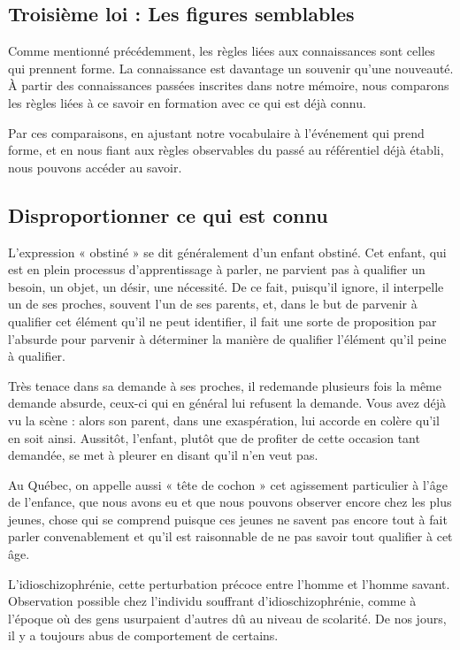 \documentclass[12pt,oneside]{article}
\begin{document}
\subsection{Troisième loi : Les figures semblables}

Comme mentionné précédemment, les règles liées aux connaissances sont celles qui prennent forme. La connaissance est davantage un souvenir qu'une nouveauté. À partir des connaissances passées inscrites dans notre mémoire, nous comparons les règles liées à ce savoir en formation avec ce qui est déjà connu.

Par ces comparaisons, en ajustant notre vocabulaire à l'événement qui prend forme, et en nous fiant aux règles observables du passé au référentiel déjà établi, nous pouvons accéder au savoir.

\subsection{Disproportionner ce qui est connu}

L'expression « obstiné » se dit généralement d'un enfant obstiné. Cet enfant, qui est en plein processus d'apprentissage à parler, ne parvient pas à qualifier un besoin, un objet, un désir, une nécessité. De ce fait, puisqu'il ignore, il interpelle un de ses proches, souvent l'un de ses parents, et, dans le but de parvenir à qualifier cet élément qu'il ne peut identifier, il fait une sorte de proposition par l'absurde pour parvenir à déterminer la manière de qualifier l'élément qu'il peine à qualifier.

Très tenace dans sa demande à ses proches, il redemande plusieurs fois la même demande absurde, ceux-ci qui en général lui refusent la demande. Vous avez déjà vu la scène : alors son parent, dans une exaspération, lui accorde en colère qu'il en soit ainsi. Aussitôt, l'enfant, plutôt que de profiter de cette occasion tant demandée, se met à pleurer en disant qu'il n'en veut pas.

Au Québec, on appelle aussi « tête de cochon » cet agissement particulier à l'âge de l'enfance, que nous avons eu et que nous pouvons observer encore chez les plus jeunes, chose qui se comprend puisque ces jeunes ne savent pas encore tout à fait parler convenablement et qu'il est raisonnable de ne pas savoir tout qualifier à cet âge.

L'idioschizophrénie, cette perturbation précoce entre l'homme et l'homme savant. Observation possible chez l'individu souffrant d'idioschizophrénie, comme à l'époque où des gens usurpaient d'autres dû au niveau de scolarité. De nos jours, il y a toujours abus de comportement de certains.
\end{document}

